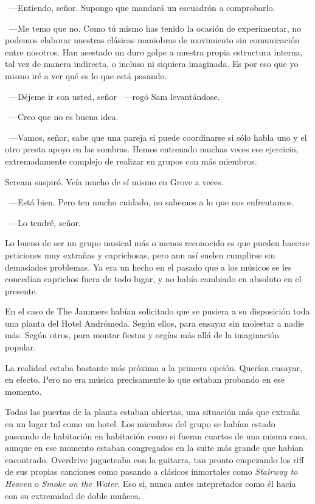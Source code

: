 ~---Entiendo, señor. Supongo que mandará un escuadrón a comprobarlo.

~---Me temo que no. Como tú mismo has tenido la ocasión de experimentar, no podemos elaborar nuestras clásicas maniobras de movimiento sin comunicación entre nosotros. Han asestado un duro golpe a nuestra propia estructura interna, tal vez de manera indirecta, o incluso ni siquiera imaginada. Es por eso que yo mismo iré a ver qué es lo que está pasando.

~---Déjeme ir con usted, señor ~---rogó Sam levantándose.

~---Creo que no es buena idea.

~---Vamos, señor, sabe que una pareja sí puede coordinarse si sólo habla uno y el otro presta apoyo en las sombras. Hemos entrenado muchas veces ese ejercicio, extremadamente complejo de realizar en grupos con más miembros.

Scream suspiró. Veía mucho de sí mismo en Grove a veces.

~---Está bien. Pero ten mucho cuidado, no sabemos a lo que nos enfrentamos.

~---Lo tendré, señor.

\parbreak
Lo bueno de ser un grupo musical más o menos reconocido es que pueden hacerse peticiones muy extrañas y caprichosas, pero aun así suelen cumplirse sin demasiados problemas. Ya era un hecho en el pasado que a los músicos se les concedían caprichos fuera de todo lugar, y no había cambiado en absoluto en el presente.

En el caso de The Jammers habían solicitado que se pusiera a su disposición toda una planta del Hotel Andrómeda. Según ellos, para ensayar sin molestar a nadie más. Según otros, para montar fiestas y orgías más allá de la imaginación popular.

La realidad estaba bastante más próxima a la primera opción. Querían ensayar, en efecto. Pero no era música precisamente lo que estaban probando en ese momento.

Todas las puertas de la planta estaban abiertas, una situación más que extraña en un lugar tal como un hotel. Los miembros del grupo se habían estado paseando de habitación en habitación como si fueran cuartos de una misma casa, aunque en ese momento estaban congregados en la suite más grande que habían encontrado. Overdrive jugueteaba con la guitarra, tan pronto empezando los riff de sus propias canciones como pasando a clásicos inmortales como \emph{Stairway to Heaven} o \emph{Smoke on the Water}. Eso sí, nunca antes intepretados como él hacía con su extremidad de doble muñeca.

